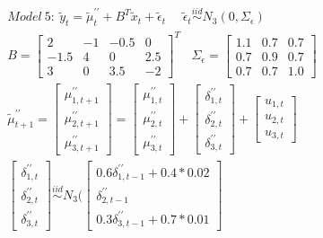 \documentclass[twoside,11pt]{article}
\begin{document}
\begin{equation} \label{eq:model5}
\begin{gathered}
Model\ 5:\ \tilde{y}_t=\tilde{\mu}^{\prime\prime}_t+B^T\tilde{x}_t+\tilde{\epsilon}_t\ \ \ \ \ \ \tilde{\epsilon}_t\stackrel{iid}\sim N_3(0,\Sigma_\epsilon)\\
B=\begin{bmatrix}
2 & -1 & -0.5 & 0 \\
-1.5 & 4 & 0 & 2.5 \\
3 & 0 & 3.5 & -2 
\end{bmatrix}^T \ \ \ \ \Sigma_\epsilon=\begin{bmatrix}
1.1 & 0.7 & 0.7  \\
0.7 & 0.9 & 0.7 \\
0.7 & 0.7 & 1.0
\end{bmatrix}\\
\tilde{\mu}^{\prime\prime}_{t+1}=\begin{bmatrix}
\mu_{1,t+1}^{\prime\prime}  \\
\mu_{2,t+1}^{\prime\prime} \\
\mu_{3,t+1}^{\prime\prime}
\end{bmatrix}=\begin{bmatrix}
\mu_{1,t}^{\prime\prime}  \\
\mu_{2,t}^{\prime\prime} \\
\mu_{3,t}^{\prime\prime}
\end{bmatrix}+\begin{bmatrix}
\delta_{1,t}^{\prime\prime}  \\
\delta_{2,t}^{\prime\prime} \\
\delta_{3,t}^{\prime\prime}
\end{bmatrix}+\begin{bmatrix}
u_{1,t}  \\
u_{2,t} \\
u_{3,t}
\end{bmatrix}\\
\begin{bmatrix}
\delta_{1,t}^{\prime\prime}  \\
\delta_{2,t}^{\prime\prime} \\
\delta_{3,t}^{\prime\prime} 
\end{bmatrix}\stackrel{iid}\sim N_3\Bigg(
\begin{bmatrix}
0.6\delta_{1,t-1}^{\prime\prime}+0.4*0.02  \\
\delta_{2,t-1}^{\prime\prime} \\
0.3\delta_{3,t-1}^{\prime\prime}+0.7*0.01

\end{bmatrix}
\end{gathered}
\end{equation}
\end{document}
